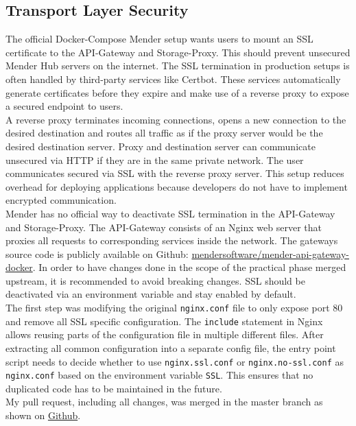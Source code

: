 \subsection{Transport Layer Security}
The official Docker-Compose Mender setup wants users to mount an SSL certificate to the API-Gateway and Storage-Proxy. This should prevent unsecured Mender Hub servers on the internet. The SSL termination in production setups is often handled by third-party services like Certbot. These services automatically generate certificates before they expire and make use of a reverse proxy to expose a secured endpoint to users.\\
A reverse proxy terminates incoming connections, opens a new connection to the desired destination and routes all traffic as if the proxy server would be the desired destination server. Proxy and destination server can communicate unsecured via HTTP if they are in the same private network. The user communicates secured via SSL with the reverse proxy server. This setup reduces overhead for deploying applications because developers do not have to implement encrypted communication.\\
Mender has no official way to deactivate SSL termination in the API-Gateway and Storage-Proxy. The API-Gateway consists of an Nginx web server that proxies all requests to corresponding services inside the network. The gateways source code is publicly available on Github: \href{https://github.com/mendersoftware/mender-api-gateway-docker}{mendersoftware/mender-api-gateway-docker}. In order to have changes done in the scope of the practical phase merged upstream, it is recommended to avoid breaking changes. SSL should be deactivated via an environment variable and stay enabled by default.\\
The first step was modifying the original \verb|nginx.conf| file to only expose port 80 and remove all SSL specific configuration. The \verb|include| statement in Nginx allows reusing parts of the configuration file in multiple different files. After extracting all common configuration into a separate config file, the entry point script needs to decide whether to use \verb|nginx.ssl.conf| or \verb|nginx.no-ssl.conf| as \verb|nginx.conf| based on the environment variable \verb|SSL|. This ensures that no duplicated code has to be maintained in the future.\\
My pull request, including all changes, was merged in the master branch as shown on \href{https://github.com/mendersoftware/mender-api-gateway-docker/pull/109}{Github}.\\

